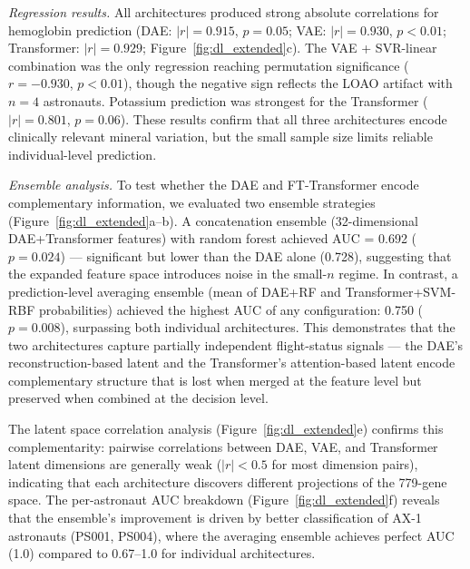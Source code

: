 \documentclass[11pt,a4paper]{article}
\begin{document}
\textit{Regression results.} All architectures produced strong absolute correlations for hemoglobin prediction (DAE: $|r| = 0.915$, $p = 0.05$; VAE: $|r| = 0.930$, $p < 0.01$; Transformer: $|r| = 0.929$; Figure~\ref{fig:dl_extended}c). The VAE + SVR-linear combination was the only regression reaching permutation significance ($r = -0.930$, $p < 0.01$), though the negative sign reflects the LOAO artifact with $n = 4$ astronauts. Potassium prediction was strongest for the Transformer ($|r| = 0.801$, $p = 0.06$). These results confirm that all three architectures encode clinically relevant mineral variation, but the small sample size limits reliable individual-level prediction.

\textit{Ensemble analysis.} To test whether the DAE and FT-Transformer encode complementary information, we evaluated two ensemble strategies (Figure~\ref{fig:dl_extended}a--b). A concatenation ensemble (32-dimensional DAE+Transformer features) with random forest achieved AUC = 0.692 ($p = 0.024$) --- significant but lower than the DAE alone (0.728), suggesting that the expanded feature space introduces noise in the small-$n$ regime. In contrast, a prediction-level averaging ensemble (mean of DAE+RF and Transformer+SVM-RBF probabilities) achieved the highest AUC of any configuration: 0.750 ($p = 0.008$), surpassing both individual architectures. This demonstrates that the two architectures capture partially independent flight-status signals --- the DAE's reconstruction-based latent and the Transformer's attention-based latent encode complementary structure that is lost when merged at the feature level but preserved when combined at the decision level.

The latent space correlation analysis (Figure~\ref{fig:dl_extended}e) confirms this complementarity: pairwise correlations between DAE, VAE, and Transformer latent dimensions are generally weak ($|r| < 0.5$ for most dimension pairs), indicating that each architecture discovers different projections of the 779-gene space. The per-astronaut AUC breakdown (Figure~\ref{fig:dl_extended}f) reveals that the ensemble's improvement is driven by better classification of AX-1 astronauts (PS001, PS004), where the averaging ensemble achieves perfect AUC (1.0) compared to 0.67--1.0 for individual architectures.
\end{document}
